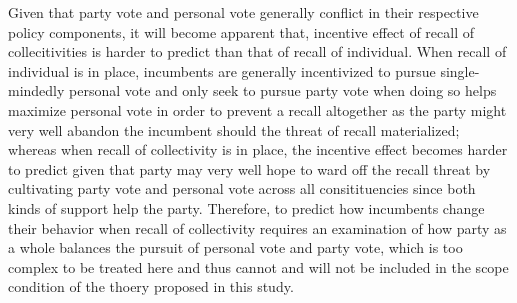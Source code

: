 \documentclass[hyphens, crop=false]{standalone}
\begin{document}
	Given that party vote and personal vote generally conflict in their respective policy components,
	it will become apparent that,
	incentive effect of
	recall of collecitivities
	is harder to predict than
	that of recall of individual.
	When recall of individual is in place,
	incumbents are generally incentivized to pursue single-mindedly personal vote
	and only seek to pursue party vote when doing so helps maximize personal vote
	in order
	to prevent a recall altogether as
	the party might very well abandon the incumbent
	should the threat of recall materialized;
	whereas when recall of collectivity is in place,
	the incentive effect becomes harder to predict
	given that party may very well
	hope to ward off the recall threat by cultivating
	party vote and personal vote across all consitituencies
	since both kinds of support help the party.
	Therefore,
	to predict how incumbents change their behavior
	when recall of collectivity
	requires an examination of how party
	as a whole balances the pursuit of personal vote and party vote,
	which is too complex to be treated here
	and thus cannot and will not be included in the scope condition of the thoery
	proposed in this study.
	
	

	
		
	
	
\end{document}
